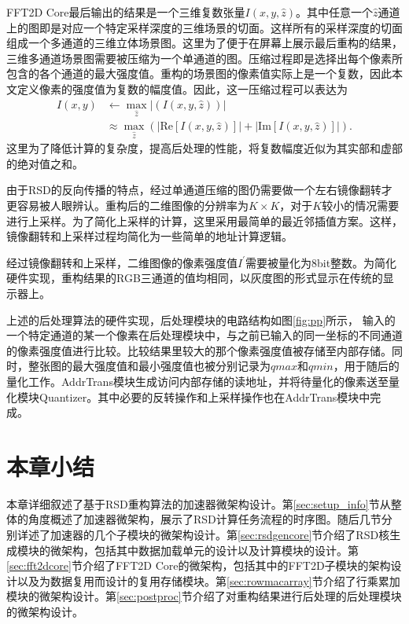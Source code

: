 \documentclass[master]{shtthesis}             %
\begin{document}
FFT2D Core最后输出的结果是一个三维复数张量$I(x,y,\hat{z})$。其中任意一个$\hat{z}$通道上的图即是对应一个特定采样深度的三维场景的切面。这样所有的采样深度的切面组成一个多通道的三维立体场景图。这里为了便于在屏幕上展示最后重构的结果，三维多通道场景图需要被压缩为一个单通道的图。压缩过程即是选择出每个像素所包含的各个通道的最大强度值。重构的场景图的像素值实际上是一个复数，因此本文定义像素的强度值为复数的幅度值。因此，这一压缩过程可以表达为
\begin{equation}
  \begin{split}
    I(x, y) &\leftarrow \max_{\hat{z}} |(I(x, y, \hat{z}))| \\
    &\approx \max_{\hat{z}} \left(|\text{Re}[I(x,y,\hat{z})]| + |\text{Im}[I(x,y,\hat{z})]| \right).
  \end{split}
\end{equation}
这里为了降低计算的复杂度，提高后处理的性能，将复数幅度近似为其实部和虚部的绝对值之和。

由于RSD的反向传播的特点，经过单通道压缩的图仍需要做一个左右镜像翻转才更容易被人眼辨认。重构后的二维图像的分辨率为$K\times K$，对于$K$较小的情况需要进行上采样。为了简化上采样的计算，这里采用最简单的最近邻插值方案。这样，镜像翻转和上采样过程均简化为一些简单的地址计算逻辑。

经过镜像翻转和上采样，二维图像的像素强度值$I^\prime$需要被量化为8bit整数。为简化硬件实现，重构结果的RGB三通道的值均相同，以灰度图的形式显示在传统的显示器上。

上述的后处理算法的硬件实现，后处理模块的电路结构如图\ref{fig:pp}所示，
输入的一个特定通道的某一个像素在后处理模块中，与之前已输入的同一坐标的不同通道的像素强度值进行比较。比较结果里较大的那个像素强度值被存储至内部存储。同时，整张图的最大强度值和最小强度值也被分别记录为$qmax$和$qmin$，用于随后的量化工作。{AddrTrans}模块生成访问内部存储的读地址，并将待量化的像素送至量化模块{Quantizer}。其中必要的反转操作和上采样操作也在{AddrTrans}模块中完成。

\section{本章小结}

本章详细叙述了基于RSD重构算法的加速器微架构设计。第\ref{sec:setup_info}节从整体的角度概述了加速器微架构，展示了RSD计算任务流程的时序图。随后几节分别详述了加速器的几个子模块的微架构设计。第\ref{sec:rsdgencore}节介绍了RSD核生成模块的微架构，包括其中数据加载单元的设计以及计算模块的设计。第\ref{sec:fft2dcore}节介绍了FFT2D Core的微架构，包括其中的FFT2D子模块的架构设计以及为数据复用而设计的复用存储模块。第\ref{sec:rowmacarray}节介绍了行乘累加模块的微架构设计。第\ref{sec:postproc}节介绍了对重构结果进行后处理的后处理模块的微架构设计。
\end{document}
